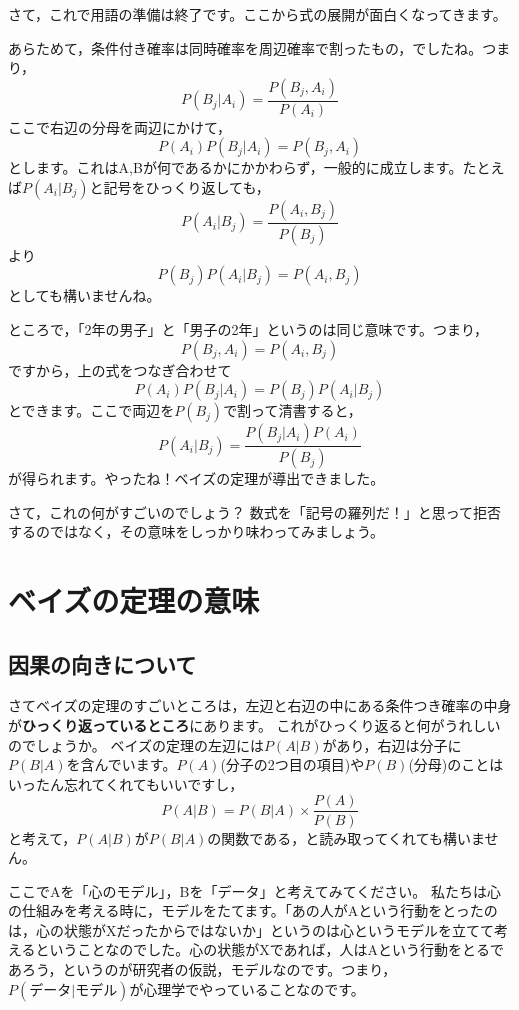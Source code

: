 \documentclass{ltjsbook}
\begin{document}
さて，これで用語の準備は終了です。ここから式の展開が面白くなってきます。

あらためて，条件付き確率は同時確率を周辺確率で割ったもの，でしたね。つまり，
\[ P(B_j | A_i) = \frac{P(B_j,A_i)}{P(A_i)} \]
ここで右辺の分母を両辺にかけて，
\[ P(A_i)P(B_j|A_i) = P(B_j,A_i) \]
とします。これはA,Bが何であるかにかかわらず，一般的に成立します。たとえば$P(A_i|B_j)$と記号をひっくり返しても，
\[ P(A_i|B_j) = \frac{P(A_i,B_j)}{P(B_j)} \]
より
\[P(B_j)P(A_i|B_j) = P(A_i,B_j) \]
としても構いませんね。


ところで，「2年の男子」と「男子の2年」というのは同じ意味です。つまり，
\[P(B_j,A_i) = P(A_i, B_j) \]
ですから，上の式をつなぎ合わせて
\[P(A_i)P(B_j|A_i) = P(B_j)P(A_i|B_j) \]
とできます。ここで両辺を$P(B_j)$で割って清書すると，
\[ P(A_i | B_j )=\frac{P(B_j|A_i)P(A_i)}{P(B_j)} \]
が得られます。やったね！ベイズの定理が導出できました。


さて，これの何がすごいのでしょう？ 数式を「記号の羅列だ！」と思って拒否するのではなく，その意味をしっかり味わってみましょう。

\section{ベイズの定理の意味}
\subsection{因果の向きについて}
さてベイズの定理のすごいところは，左辺と右辺の中にある条件つき確率の中身が\textbf{ひっくり返っているところ}にあります。
これがひっくり返ると何がうれしいのでしょうか。
ベイズの定理の左辺には$P(A|B)$があり，右辺は分子に$P(B|A)$を含んでいます。$P(A)$(分子の2つ目の項目)や$P(B)$(分母)のことはいったん忘れてくれてもいいですし，
\[ P(A|B) = P(B|A) \times \frac{P(A)}{P(B)}\]
と考えて，$P(A|B)$が$P(B|A)$の関数である，と読み取ってくれても構いません。

ここでAを「心のモデル」，Bを「データ」と考えてみてください。
私たちは心の仕組みを考える時に，モデルをたてます。「あの人がAという行動をとったのは，心の状態がXだったからではないか」というのは心というモデルを立てて考えるということなのでした。心の状態がXであれば，人はAという行動をとるであろう，というのが研究者の仮説，モデルなのです。つまり，$P(\mbox{データ}|\mbox{モデル})$が心理学でやっていることなのです。
\end{document}
